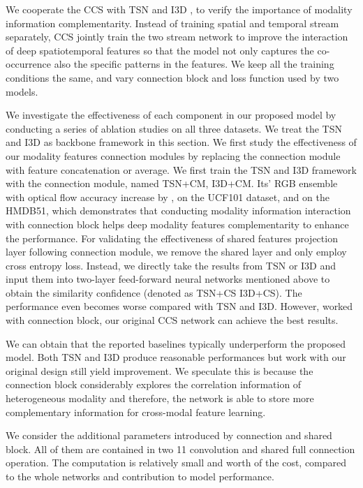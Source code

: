 \documentclass[conference,compsoc]{IEEEtran}
\begin{document}
We cooperate the CCS with TSN \cite{wang2016temporal} and I3D \cite{carreira2017quo}, to verify the importance of modality information complementarity. Instead of training spatial and temporal stream separately, CCS jointly train the two stream network to improve the interaction of deep spatiotemporal features so that the model not only captures the co-occurrence also the specific patterns in the features. We keep all the training conditions the same, and vary connection block and loss function used by two models.

We investigate the effectiveness of each component in our proposed model by conducting a series of ablation studies on all three datasets. We treat the TSN \cite{wang2016temporal} and I3D \cite{carreira2017quo} as backbone framework in this section. We first study the effectiveness of our modality features connection modules by replacing the connection module with feature concatenation or average. We first train the TSN and I3D framework with the connection module, named TSN+CM, I3D+CM. Its' RGB ensemble with optical flow accuracy increase by , on the UCF101 dataset, and  on the HMDB51, which demonstrates that conducting modality information interaction with connection block helps deep modality features complementarity to enhance the performance. For validating the effectiveness of shared features projection layer following connection module, we remove the shared layer and only employ cross entropy loss. Instead, we directly take the results from TSN or I3D and input them into two-layer feed-forward neural networks mentioned above to obtain the similarity confidence (denoted as TSN+CS I3D+CS). The performance even becomes worse compared with TSN and I3D. However, worked with connection block, our original CCS network can achieve the best results.

We can obtain that the reported baselines typically underperform the proposed model. Both TSN \cite{wang2016temporal} and I3D \cite{carreira2017quo} produce reasonable performances but work with our original design still yield improvement. We speculate this is because the connection block considerably explores the correlation information of heterogeneous modality and therefore, the network is able to store more complementary information for cross-modal feature learning.

We consider the additional parameters introduced by connection and shared block. All of them are contained in two 11 convolution and shared full connection operation. The computation is relatively small and worth of the cost, compared to the whole networks and contribution to model performance.
\end{document}
